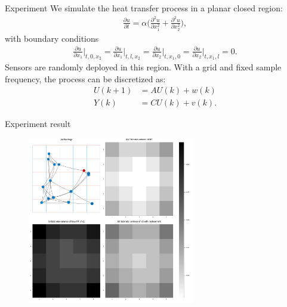 \documentclass[10pt]{beamer}
\DeclareMathOperator{\1}{\textbf{1}}
\begin{document}
	      \begin{frame}{Experiment}
		We simulate the heat transfer process in a planar closed region:
		\begin{align*}
		  \frac{\partial u}{\partial t}=\alpha\Big(\frac{\partial^2u}{\partial x_1^2}+\frac{\partial^2u}{\partial x_2^2}\Big),
		\end{align*}
		with boundary conditions
		\begin{align*}
		  \frac{\partial u}{\partial x_1}\Big|_{t,0,x_2}=\frac{\partial u}{\partial x_1}\Big|_{t,l,x_2}=\frac{\partial u}{\partial x_2}\Big|_{t,x_1,0}=\frac{\partial u}{\partial x_2}\Big|_{t,x_1,l}=0.
		\end{align*}
		Sensors are randomly deployed in this region. With a grid and fixed sample frequency, the process can be discretized as:
		\begin{align*}
		  U(k+1)&=AU(k)+w(k)\\
		  Y(k)&=CU(k)+v(k).
		\end{align*}
	      \end{frame}

	      \begin{frame}{Experiment result}
		\begin{figure}[]
		  \centering
		  \includegraphics[width=0.65\textwidth]{pic/variance.pdf}
		\end{figure}
	      \end{frame}
\end{document}
